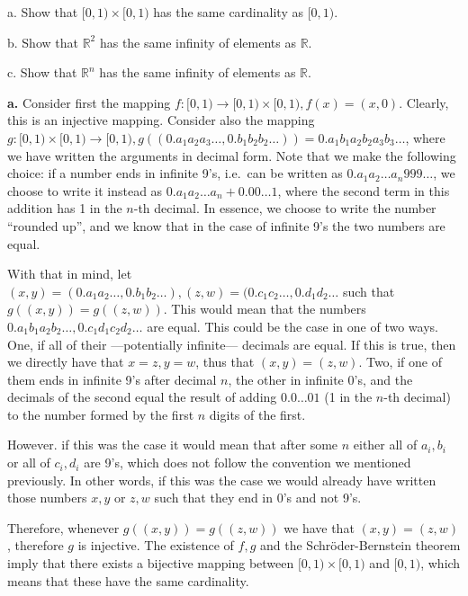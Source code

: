 \begin{exercise}{7}
    a. Show that $[0, 1) \times [0, 1)$ has the same cardinality as $[0, 1)$.
    
    b. Show that $\mathbb{R}^2$ has the same infinity of elements as $\mathbb{R}$.

    c. Show that $\mathbb{R}^n$ has the same infinity of elements as $\mathbb{R}$.
\end{exercise}

\begin{solution}

    \textbf{a.} Consider first the mapping $f:[0, 1) \rightarrow [0,1) \times [0, 1), f(x) = (x, 0)$. Clearly, this is an injective mapping. Consider also the mapping $g: [0, 1) \times [0, 1) \rightarrow [0, 1), g((0.a_1 a_2 a_3 \ldots, 0.b_1 b_2 b_2 \ldots)) = 0.a_1 b_1 a_2 b_2 a_3 b_3 \ldots$, where we have written the arguments in decimal form. Note that we make the following choice: if a number ends in infinite 9's, i.e.\ can be written as $0.a_1 a_2 \ldots a_n 9 9 9 \ldots$, we choose to write it instead as $0.a_1 a_2 \ldots a_n + 0.00\ldots 1$, where the second term in this addition has 1 in the $n$-th decimal. In essence, we choose to write the number ``rounded up'', and we know that in the case of infinite 9's the two numbers are equal.

    With that in mind, let $(x, y) = (0.a_1 a_2 \ldots, 0.b_1 b_2 \ldots), (z, w) = (0.c_1 c_2 \ldots, 0.d_1 d_2 \ldots$ such that $g((x, y)) = g((z, w))$. This would mean that the numbers $0.a_1 b_1 a_2 b_2 \ldots, 0.c_1 d_1 c_2 d_2 \ldots$ are equal. This could be the case in one of two ways. One, if all of their ---potentially infinite--- decimals are equal. If this is true, then we directly have that $x = z, y = w$, thus that $(x, y) = (z, w)$. Two, if one of them ends in infinite 9's after decimal $n$, the other in infinite 0's, and the decimals of the second equal the result of adding $0.0\ldots 0 1$ (1 in the $n$-th decimal) to the number formed by the first $n$ digits of the first. 
    
    However. if this was the case it would mean that after some $n$ either all of $a_i, b_i$ or all of $c_i, d_i$ are 9's, which does not follow the convention we mentioned previously. In other words, if this was the case we would already have written those numbers $x, y$ or $z, w$ such that they end in 0's and not 9's.

    Therefore, whenever $g((x, y)) = g((z, w))$ we have that $(x, y) = (z, w)$, therefore $g$ is injective. The existence of $f, g$ and the Schröder-Bernstein theorem imply that there exists a bijective mapping between $[0, 1) \times [0, 1)$ and $[0, 1)$, which means that these have the same cardinality.


\end{solution}
